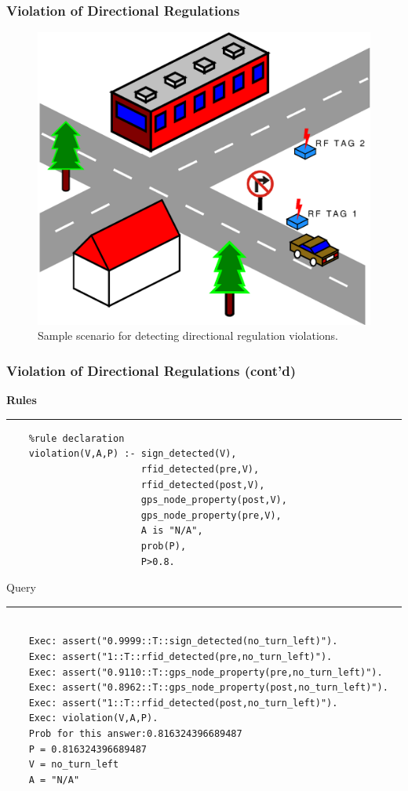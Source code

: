 \documentclass{beamer}
\newenvironment{mylisting}
{\begin{list}{}{\setlength{\leftmargin}{1em}}\item\scriptsize\bfseries}
{\end{list}}
\begin{document}
\begin{frame}[fragile]
	\frametitle{Violation of Directional Regulations}
	\begin{figure}[ht]
	\begin{center}
	\includegraphics[width=.5\paperwidth]{../img/rfid2.eps}
	\caption{Sample scenario for detecting directional regulation violations.}
	\label{fig:dirreg}
	\end{center}
	\end{figure}
\end{frame}

\begin{frame}[fragile]
	\frametitle{Violation of Directional Regulations (cont'd)}
	\begin{mylisting}
	Rules
	\vspace*{2px}\hrule
	\begin{verbatim}
	%rule declaration
	violation(V,A,P) :- sign_detected(V),
	                    rfid_detected(pre,V),
	                    rfid_detected(post,V), 
	                    gps_node_property(post,V), 
	                    gps_node_property(pre,V), 
	                    A is "N/A",
	                    prob(P),
	                    P>0.8.
	\end{verbatim}
	
	Query
	\vspace*{2px}\hrule
	\begin{verbatim}
	
	Exec: assert("0.9999::T::sign_detected(no_turn_left)").
	Exec: assert("1::T::rfid_detected(pre,no_turn_left)").
	Exec: assert("0.9110::T::gps_node_property(pre,no_turn_left)").
	Exec: assert("0.8962::T::gps_node_property(post,no_turn_left)").
	Exec: assert("1::T::rfid_detected(post,no_turn_left)").
	Exec: violation(V,A,P).
	Prob for this answer:0.816324396689487
	P = 0.816324396689487
	V = no_turn_left
	A = "N/A"
	\end{verbatim}
	\end{mylisting}
\end{frame}
\end{document}

